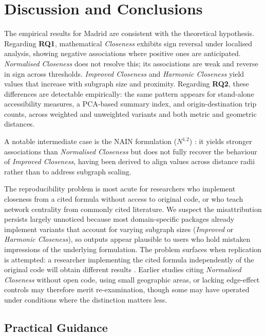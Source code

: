 \section{Discussion and Conclusions}\label{discussion}

The empirical results for Madrid are consistent with the theoretical hypothesis. Regarding \textbf{RQ1}, mathematical \emph{Closeness} exhibits sign reversal under localised analysis, showing negative associations where positive ones are anticipated. \emph{Normalised Closeness} does not resolve this; its associations are weak and reverse in sign across thresholds. \emph{Improved Closeness} and \emph{Harmonic Closeness} yield values that increase with subgraph size and proximity. Regarding \textbf{RQ2}, these differences are detectable empirically: the same pattern appears for stand-alone accessibility measures, a PCA-based summary index, and origin-destination trip counts, across weighted and unweighted variants and both metric and geometric distances.

A notable intermediate case is the NAIN formulation ($N^{1.2}$) \cite{Hillier2012}: it yields stronger associations than \emph{Normalised Closeness} but does not fully recover the behaviour of \emph{Improved Closeness}, having been derived to align values across distance radii rather than to address subgraph scaling.

The reproducibility problem is most acute for researchers who implement closeness from a cited formula without access to original code, or who teach network centrality from commonly cited literature. We suspect the misattribution persists largely unnoticed because most domain-specific packages already implement variants that account for varying subgraph sizes (\emph{Improved} or \emph{Harmonic Closeness}), so outputs appear plausible to users who hold mistaken impressions of the underlying formulation. The problem surfaces when replication is attempted: a researcher implementing the cited formula independently of the original code will obtain different results \cite{turner_depthmapx_2020, stahle_place_2023, simons_cityseer_2023, hagberg_exploring_2008, csardi_igraph_2006}. Earlier studies citing \emph{Normalised Closeness} without open code, using small geographic areas, or lacking edge-effect controls \cite{Turner2007, Porta2006} may therefore merit re-examination, though some may have operated under conditions where the distinction matters less.

\subsection{Practical Guidance}

